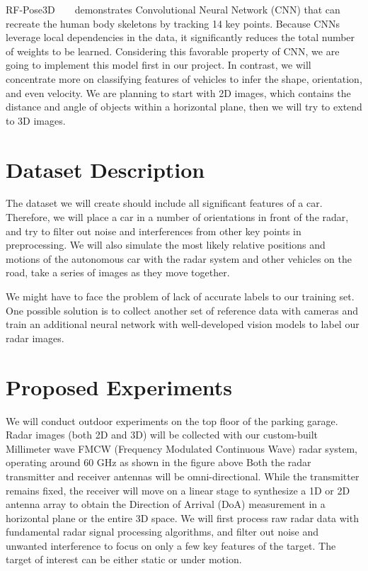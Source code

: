 \documentclass[10pt,twocolumn,letterpaper]{article}
\begin{document}
\par RF-Pose3D ~\cite{rfpose} ~\cite{rfpose3D} demonstrates Convolutional Neural Network (CNN) that can recreate the human body skeletons by tracking 14 key points. Because CNNs leverage local dependencies in the data, it significantly reduces the total number of weights to be learned. Considering this favorable property of CNN, we are going to implement this model first in our project. In contrast, we will concentrate more on classifying features of vehicles to infer the shape, orientation, and even velocity. We are planning to start with 2D images, which contains the distance and angle of objects within a horizontal plane, then we will try to extend to 3D images.

\section{Dataset Description}
The dataset we will create should include all significant features of a car. Therefore, we will place a car in a number of orientations in front of the radar, and try to filter out noise and interferences from other key points in preprocessing. We will also simulate the most likely relative positions and motions of the autonomous car with the radar system and other vehicles on the road, take a series of images as they move together.
\par We might have to face the problem of lack of accurate labels to our training set. One possible solution is to collect another set of reference data with cameras and train an additional neural network with well-developed vision models to label our radar images.

\section{Proposed Experiments}
We will conduct outdoor experiments on the top floor of the parking garage. Radar images (both 2D and 3D) will be collected with our custom-built Millimeter wave FMCW (Frequency Modulated Continuous Wave) radar system, operating around 60 GHz as shown in the figure above Both the radar transmitter and receiver antennas will be omni-directional. While the transmitter remains fixed, the receiver will move on a linear stage to synthesize a 1D or 2D antenna array to obtain the Direction of Arrival (DoA) measurement in a horizontal plane or the entire 3D space. We will first process raw radar data with fundamental radar signal processing algorithms, and filter out noise and unwanted interference to focus on only a few key features of the target. The target of interest can be either static or under motion. 
\end{document}
